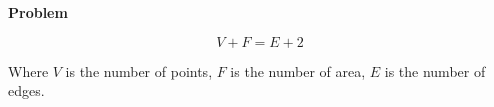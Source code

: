 \noindent\textbf{Problem}

\begin{equation*}
V+F=E+2
\end{equation*}

Where $V$ is the number of points, $F$ is the number of area, $E$ is the number of edges.

